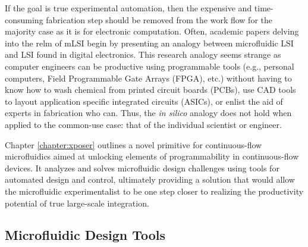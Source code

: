 
If the goal is true experimental automation, then the expensive and time-consuming fabrication step should be removed from the work flow for the majority case as it is for electronic computation. Often, academic papers delving into the relm of mLSI begin by presenting an analogy between microfluidic LSI and LSI found in digital electronics. This research analogy seems strange as computer engineers can be productive using programmable tools (e.g., personal computers, Field Programmable Gate Arrays (FPGA), etc.) without having to know how to wash chemical from printed circuit boards (PCBs), use CAD tools to layout application specific integrated circuits (ASICs), or enlist the aid of experts in fabrication who can. Thus, the \emph{in silico} analogy does not hold when applied to the common-use case: that of the individual scientist or engineer.

Chapter \ref{chapter:xposer} outlines a novel primitive for continuous-flow microfluidics aimed at unlocking elements of programmability in continuous-flow devices. It analyzes and solves microfluidic design challenges using tools for automated design and control, ultimately providing a solution that would allow the microfluidic experimentalist to be one step closer to realizing the productivity potential of true large-scale integration. 

\subsection{Microfluidic Design Tools}
\label{ssec:DesignTools}

